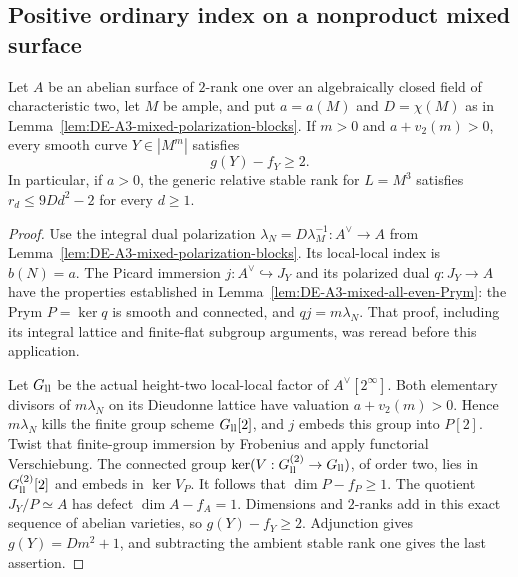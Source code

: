 \subsection{Positive ordinary index on a nonproduct mixed surface}
\label{sec:DE-A3-mixed-positive-index}

\begin{lemma}
\label{lem:DE-A3-positive-index-Prym}
Let $A$ be an abelian surface of $2$-rank one over an algebraically
closed field of characteristic two, let $M$ be ample, and put
$a=a(M)$ and $D=\chi(M)$ as in
Lemma~\ref{lem:DE-A3-mixed-polarization-blocks}.
If $m>0$ and $a+v_2(m)>0$, every smooth curve $Y\in|M^m|$ satisfies
\[
                         g(Y)-f_Y\ge2.
\]
In particular, if $a>0$, the generic relative stable rank for
$L=M^3$ satisfies $r_d\le9Dd^2-2$ for every $d\ge1$.
\end{lemma}
\begin{proof}
Use the integral dual polarization
$\lambda_N=D\lambda_M^{-1}:A^\vee\to A$ from
Lemma~\ref{lem:DE-A3-mixed-polarization-blocks}.
Its local-local index is $b(N)=a$.
The Picard immersion $j:A^\vee\hookrightarrow J_Y$ and its
polarized dual $q:J_Y\to A$ have the properties established in
Lemma~\ref{lem:DE-A3-mixed-all-even-Prym}: the Prym $P=\ker q$
is smooth and connected, and $qj=m\lambda_N$.
That proof, including its integral lattice and finite-flat
subgroup arguments, was reread before this application.

Let $G_{\rm ll}$ be the actual height-two local-local factor of
$A^\vee[2^\infty]$.
Both elementary divisors of $m\lambda_N$ on its Dieudonne lattice
have valuation $a+v_2(m)>0$.
Hence $m\lambda_N$ kills the finite group scheme $G_{\rm ll}[2]$,
and $j$ embeds this group into $P[2]$.
Twist that finite-group immersion by Frobenius and apply functorial
Verschiebung.  The connected group
$\ker(V:G_{\rm ll}^{(2)}\to G_{\rm ll})$, of order two, lies in
$G_{\rm ll}^{(2)}[2]$ and embeds in $\ker V_P$.
It follows that $\dim P-f_P\ge1$.
The quotient $J_Y/P\simeq A$ has defect $\dim A-f_A=1$.
Dimensions and $2$-ranks add in this exact sequence of abelian
varieties, so $g(Y)-f_Y\ge2$.
Adjunction gives $g(Y)=Dm^2+1$, and subtracting the ambient
stable rank one gives the last assertion.
\end{proof}

